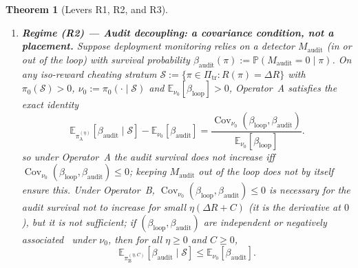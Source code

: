 \documentclass[11pt,a4paper]{article}
\newtheorem{theorem}{Theorem}
\newcommand{\E}{\mathbb{E}}
\newcommand{\Prob}{\mathbb{P}}
\newcommand{\Cov}{\operatorname{Cov}}
\begin{document}
\begin{theorem}[Levers R1, R2, and R3]
\begin{enumerate}
  \item \textbf{Regime (R2) --- Audit decoupling: a covariance condition, not a placement.} Suppose deployment monitoring relies on a detector $M_{\mathrm{audit}}$ (in or out of the loop) with survival probability $\beta_{\mathrm{audit}}(\pi) := \Prob(M_{\mathrm{audit}} = 0 \mid \pi)$. On any iso-reward cheating stratum $\mathcal{S} := \{\pi \in \Pi_{\mathrm{tr}} : R(\pi) = \Delta R\}$ with $\pi_0(\mathcal{S}) > 0$, $\nu_0 := \pi_0(\cdot \mid \mathcal{S})$ and $\E_{\nu_0}[\beta_{\mathrm{loop}}] > 0$, Operator~A satisfies the exact identity
  \begin{equation}\label{eq:R2}
    \E_{\pi_{\mathrm{A}}^{(\eta)}}[\beta_{\mathrm{audit}} \mid \mathcal{S}] - \E_{\nu_0}[\beta_{\mathrm{audit}}]
    = \frac{\Cov_{\nu_0}(\beta_{\mathrm{loop}}, \beta_{\mathrm{audit}})}{\E_{\nu_0}[\beta_{\mathrm{loop}}]}.
  \end{equation}
  so under Operator~A the audit survival does not increase iff $\Cov_{\nu_0}(\beta_{\mathrm{loop}}, \beta_{\mathrm{audit}}) \le 0$; keeping $M_{\mathrm{audit}}$ out of the loop does not by itself ensure this. Under Operator~B, $\Cov_{\nu_0}(\beta_{\mathrm{loop}}, \beta_{\mathrm{audit}}) \le 0$ is necessary for the audit survival not to increase for small $\eta(\Delta R + C)$ (it is the derivative at $0$), but it is not sufficient; if $(\beta_{\mathrm{loop}}, \beta_{\mathrm{audit}})$ are independent or negatively associated~\cite{joagdev1983} under $\nu_0$, then for all $\eta \ge 0$ and $C \ge 0$,
  \begin{equation}
    \E_{\pi_{\mathrm{B}}^{(\eta, C)}}[\beta_{\mathrm{audit}} \mid \mathcal{S}] \le \E_{\nu_0}[\beta_{\mathrm{audit}}].
  \end{equation}


\end{enumerate}
\end{theorem}
\end{document}
